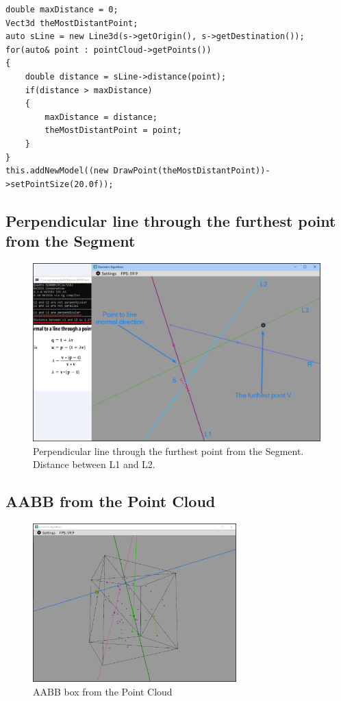 \documentclass[12pt,a4paper,english]{article}
\begin{document}
\begin{verbatim}
double maxDistance = 0;
Vect3d theMostDistantPoint;
auto sLine = new Line3d(s->getOrigin(), s->getDestination());
for(auto& point : pointCloud->getPoints())
{
    double distance = sLine->distance(point);
    if(distance > maxDistance)
    {
        maxDistance = distance;
        theMostDistantPoint = point;
    }
}
this.addNewModel((new DrawPoint(theMostDistantPoint))->setPointSize(20.0f));
\end{verbatim}

\subsection{Perpendicular line through the furthest point from the Segment}

\begin{figure}[H]
    \centering
    \includegraphics[width=0.99\textwidth]{p2a-4}
    \caption[]{Perpendicular line through the furthest point from the Segment.\\ Distance between L1 and L2.}
    \label{fig:p2a-4}
\end{figure}

\subsection{AABB from the Point Cloud}

\begin{figure}[H]
    \centering
    \includegraphics[width=0.7\textwidth]{p2a-5}
    \caption[]{AABB box from the Point Cloud}
    \label{fig:p2a-5}
\end{figure}
\end{document}
